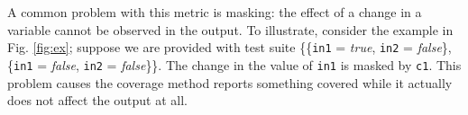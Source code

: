 A common problem with this metric is masking:
the effect of a change in a variable cannot be observed in the output. To illustrate, consider the example in Fig. \ref{fig:ex}; suppose we are provided with
test suite \{\{{\tt in1} = \emph{true}, {\tt in2} = \emph{false}\},
\{{\tt in1} = \emph{false}, {\tt in2} = \emph{false}\}\}. The change in the value of
{\tt in1} is masked by {\tt c1}. This problem causes the coverage method reports something covered
while it actually does not affect the output at all.




